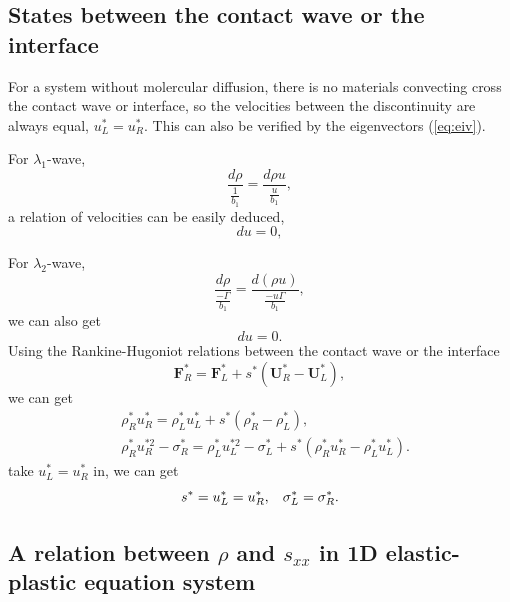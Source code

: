 \documentclass{article}
\numberwithin{equation}{section}
\numberwithin{table}{section}
\begin{document}
  \subsection{States between the  contact wave or the interface}
  For  a  system without molercular diffusion, there is no materials convecting  cross the contact wave or interface, so the velocities between the discontinuity are always equal, $u_L^* = u_R^*$. This can also be verified by the eigenvectors (\ref{eq:eiv}).

  For $\lambda_1$-wave, 
  \begin{equation}
	\frac{d\rho}{\frac{1}{b_1}} = \frac{d\rho u}{\frac{u}{b_1}},
  \end{equation}
  a relation of velocities can be easily deduced,
  \begin{equation}
	du =0,
  \end{equation}

 For $\lambda_2$-wave,
 \begin{equation}
   \frac{d\rho}{\frac{-\Gamma}{b_1}} = \frac{d(\rho u)}{\frac{-u\Gamma}{b_1}},
\end{equation}
we can  also get  
  \begin{equation}
	du =0.
  \end{equation}
Using  the Rankine-Hugoniot relations between the contact wave  or  the interface
\begin{equation}
	\bm{F}_R^* = \bm{F}_L^*+s^*(\bm{U}_R^*-\bm{U}_L^*),
\end{equation}
we can get 
\begin{align}
  &\rho_R^* u_R^*=\rho_L^* u_L^*+s^*(\rho_R^*-\rho_L^*),\\
  &\rho_R^* u_R^{*2}-\sigma^*_R=\rho_L^* u_L^{*2}-\sigma_L^*+s^*(\rho_R^* u_R^*-\rho_L^* u_L^*).
\end{align}
take $u_L^* = u_R^*$ in, we can get 
\begin{equation}\label{eq:sigmaLR}
  s^* = u_L^* = u_R^*, \hspace{0.3cm} \sigma_L^* = \sigma_R^*.
\end{equation}

\subsection{A relation between $\rho$ and $s_{xx}$ in 1D elastic-plastic  equation system}
 
\end{document}
